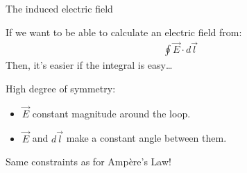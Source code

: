 \documentclass[aspectratio=169,
hyperref={colorlinks,urlcolor=blue}
]{beamer}
\begin{document}
\begin{bulletframe}{The induced electric field}
\item If we want to be able to calculate an electric field from:
\begin{align*}
\oint \vec E\cdot d\vec l
\end{align*}
Then, it’s easier if the integral is easy…
\item[$\rightarrow$] High degree of symmetry:
\begin{itemize}
\item $\vec E$ constant magnitude around the loop.
\item $\vec E$ and $d\vec l$ make a constant angle between them.
\end{itemize}
\item Same constraints as for Ampère’s Law!
\end{bulletframe}
\end{document}
